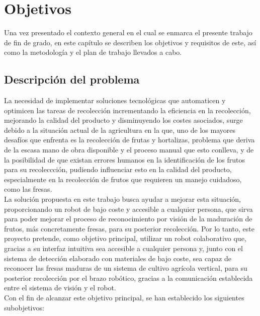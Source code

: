 \chapter{Objetivos}
\label{cap:capitulo3}
\setcounter{footnote}{12}
 
Una vez presentado el contexto general en el cual se enmarca el presente trabajo de fin de grado, en este capítulo se describen los objetivos y requisitos de este, así como la metodología y el plan de trabajo llevados a cabo.

\section{Descripción del problema}
\label{sec:descripcion}

La necesidad de implementar soluciones tecnológicas que automaticen y optimicen las tareas de recolección incrementando la eficiencia en la recolección, mejorando la calidad del producto y disminuyendo los costes asociados, surge debido a la situación actual de la agricultura en la que, uno de los mayores desafíos que enfrenta es la recolección de frutas y hortalizas, problema que deriva de la escasa mano de obra disponible y el proceso manual que esto conlleva, y de la posibilidad de que existan errores humanos en la identificación de los frutos para su recoleccción, pudiendo influenciar esto en la calidad del producto, especialmente en la recolección de frutos que requieren un manejo cuidadoso, como las fresas.\\

La solución propuesta en este trabajo busca ayudar a mejorar esta situación, proporcionando un robot de bajo coste y accesible a cualquier persona, que sirva para poder mejorar el proceso de reconocimiento por visión de la maduración de frutos, más concretamente fresas, para su posterior recolección. Por lo tanto, este proyecto pretende, como objetivo principal, utilizar un robot colaborativo que, gracias a su interfaz intuitiva sea accesible a cualquier persona y, junto con el sistema de detección elaborado con materiales de bajo coste, sea capaz de reconocer las fresas maduras de un sistema de cultivo agrícola vertical, para su posterior recolección por el brazo robótico, gracias a la comunicación establecida entre el sistema de visión y el robot.\\

Con el fin de alcanzar este objetivo principal, se han establecido los siguientes
subobjetivos:

